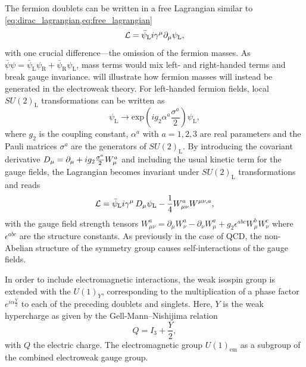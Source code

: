 The fermion doublets can be written in a free Lagrangian similar to \cref{eq:dirac_lagrangian,eq:free_lagrangian}
\begin{equation}
	\mathcal{L} = \bar{\psi}_\mathrm{L}i\gamma^\mu\partial_\mu\psi_\mathrm{L},
\end{equation}
with one crucial difference---the omission of the fermion masses. As $\bar{\psi}\psi = \bar{\psi}_\mathrm{L}\psi_\mathrm{R} + \bar{\psi}_\mathrm{R}\psi_\mathrm{L}$, mass terms would mix left- and right-handed terms and break gauge invariance.  will illustrate how fermion masses will instead be generated in the electroweak theory. For left-handed fermion fields, local $SU(2)_\mathrm{L}$ transformations can be written as
\begin{equation}
	\psi_\mathrm{L} \rightarrow \mathrm{exp}\left(ig_2\alpha^a\frac{\sigma^a}{2}\right)\psi_\mathrm{L},
\end{equation}  
where $g_2$ is the coupling constant, $\alpha^a$ with $a=1,2,3$ are real parameters and the Pauli matrices $\sigma^a$ are the generators of $SU(2)_\mathrm{L}$. By introducing the covariant derivative $\mathop{}\!D_\mu = \partial_\mu + ig_2\frac{\sigma^a}{2}W^a_\mu$ and including the usual kinetic term for the gauge fields, the Lagrangian becomes invariant under $SU(2)_\mathrm{L}$ transformations and reads
\begin{equation}
	\mathcal{L} = \bar{\psi}_\mathrm{L}i\gamma^\mu\mathop{}\!D_\mu\psi_\mathrm{L} - \frac{1}{4}W^a_{\mu\nu}W^{\mu\nu,a},
\end{equation}
with the gauge field strength tensors $W^a_{\mu\nu} = \partial_\mu W^a_\nu - \partial_\nu W^a_\mu + g_2 \epsilon^{abc}W^b_\mu W^c_\nu$ where $\epsilon^{abc}$ are the structure constants. As previously in the case of QCD, the non-Abelian structure of the symmetry group causes self-interactions of the gauge fields.

In order to include electromagnetic interactions, the weak isospin group is extended with the $U(1)_Y$, corresponding to the multiplication of a phase factor $e^{i\alpha\frac{Y}{2}}$ to each of the preceding doublets and singlets. Here, $Y$ is the weak hypercharge as given by the Gell-Mann--Nishijima relation~\cite{Gell-Mann1956,10.1143/PTP.13.285,10.1143/PTP.10.581}
\begin{equation}
	Q = I_3 + \frac{Y}{2},
	\label{eq:gell-mann-nishijima}
\end{equation}
with $Q$ the electric charge. The electromagnetic group $U(1)_\mathrm{em}$ as a subgroup of the combined electroweak gauge group.

